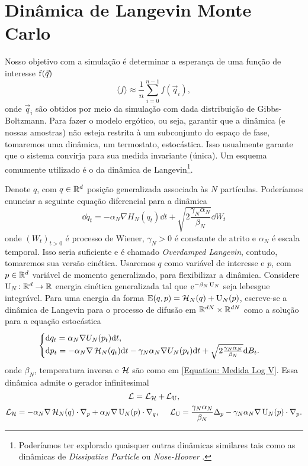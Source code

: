 \section{Dinâmica de Langevin Monte Carlo}

Nosso objetivo com a simulação é determinar a esperança de uma função de interesse $\operatorname{f}(\vec{q})$ $$\langle f \rangle \approx \frac{1}{n} \sum_{i=0}^{n-1} f(\vec{q}_i),$$ onde $\vec{q}_i$ são obtidos por meio da simulação com dada distribuição de Gibbs-Boltzmann. Para fazer o modelo ergótico, ou seja, garantir que a dinâmica (e nossas amostras) não esteja restrita à um subconjunto do espaço de fase, tomaremos uma dinâmica, um termostato, estocástica. Isso usualmente garante que o sistema convirja para sua medida invariante (única). Um esquema comumente utilizado é o da dinâmica de Langevin\footnote{Poderíamos ter explorado quaisquer outras dinâmicas similares tais como as dinâmicas de \textit{Dissipative Particle} \cite{DPD} ou \textit{Nose-Hoover} \cite{Hoover}.}.

Denote $q$, com $q \in \mathbb{R}^d$ posição generalizada associada às $N$ partículas. Poderíamos enunciar a seguinte equação diferencial para a dinâmica
\begin{equation}
	\dd q_t = -\alpha_N \nabla H_N(q_t) \dd t + \sqrt{2\frac{\gamma_N \alpha_N}{\beta_N}} \dd W_t
	\label{Equação: Langevin Overdamped}
\end{equation}
onde $(W_t)_{t>0}$ é processo de Wiener, $\gamma_N > 0$ é constante de atrito e $\alpha_N$ é escala temporal. Isso seria suficiente e é chamado \textit{Overdamped Langevin}, contudo, tomaremos sua versão cinética. Usaremos $q$ como variável de interesse e $p$, com $p \in \mathbb{R}^d$ variável de momento generalizado, para flexibilizar a dinâmica. Considere $\operatorname{U}_N \colon \mathbb{R}^d \rightarrow \mathbb{R}$ energia cinética generalizada tal que $\operatorname{e}^{-\beta_N \operatorname{U}_N}$ seja lebesgue integrável. Para uma energia da forma $\operatorname{E}(q,p) = \operatorname{\mathcal{H}}_N(q) + \operatorname{U}_N(p)$, escreve-se \cite{Stoltz2018} a dinâmica de Langevin para o processo de difusão em $\mathbb{R}^{dN} \times \mathbb{R}^{dN}$ como a solução para a equação estocástica 
\begin{equation}
\begin{cases}
	\dd q_t = \alpha_N \nabla U_N (p_t) \dd t, \\
	\dd p_t = -\alpha_N \nabla \operatorname{\mathcal{H}}_N(q_t) \dd t - \gamma_N \alpha_N \nabla U_N(p_t) \dd t + \sqrt{2\frac{\gamma_N \alpha_N}{\beta_N}} \dd B_t.
\end{cases}
\label{Equação: EqDif - Dinamica Langevin}
\end{equation}
onde $\beta_N$, temperatura inversa e $\operatorname{\mathcal{H}}$ são como em \ref{Equation: Medida Log V}. Essa dinâmica admite o gerador infinitesimal 
\[
	\operatorname{\mathcal{L}} = \operatorname{\mathcal{L}}_{\operatorname{\mathcal{H}}} + \operatorname{\mathcal{L}}_{\operatorname{U}},
\]
\[
 \operatorname{\mathcal{L}}_{\operatorname{\mathcal{H}}} = -\alpha_N \nabla\operatorname{\mathcal{H}}_N(q) \cdot \nabla_p + \alpha_N \nabla \operatorname{U}_N(p) \cdot \nabla_q, \ \ \ \ \operatorname{\mathcal{L}}_{\operatorname{U}} = \frac{\gamma_N\alpha_N}{\beta_N} \Delta_p - \gamma_N \alpha_N \nabla \operatorname{U}_N(p) \cdot \nabla_p.
\]

